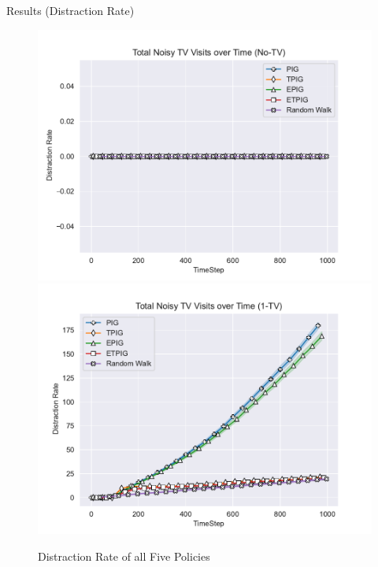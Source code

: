 	
	\begin{frame}[fragile]{Results (Distraction Rate)}
		\begin{figure}
			\begin{center}
				\includegraphics[scale=0.40]{"../images/Distraction_Rate_No-TV.pdf"}
				\includegraphics[scale=0.40]{"../images/Distraction_Rate_1-TV.pdf"}
			\end{center}
			\caption{Distraction Rate of all Five Policies}
		\end{figure}
	\end{frame}
	
	
